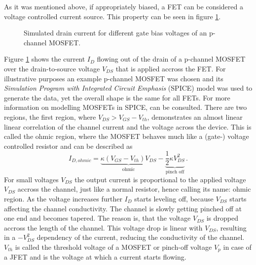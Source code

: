 As it was mentioned above, if appropriately biased, a FET can be considered a voltage controlled current source. This property can be seen in figure \ref{fig:fet_curret_gate_bias}.

\begin{figure}[hb]
    \centering
    
    \caption{Simulated drain current for different gate bias voltages of an  p-channel MOSFET.}
    \label{fig:fet_curret_gate_bias}
\end{figure}

Figure \ref{fig:fet_curret_gate_bias} shows the current $I_D$ flowing out of the drain of a p-channel MOSFET over the drain-to-source voltage $V_{DS}$ that is applied accross the FET. For illustrative purposes an example p-channel MOSFET was chosen and its \textit{Simulation Program with Integrated Circuit Emphasis} (SPICE) model \cite{irf9610_spice,irf9610_spice_better} was used to generate the data, yet the overall shape is the same for all FETs. For more information on modelling MOSFETs in SPICE, \citep[p. 442]{spice_mosfets} can be consulted. There are two regions, the first region, where $V_{DS} > V_{GS} - V_{th}$, demonstrates an almost linear linear correlation of the channel current and the voltage across the device. This is called the ohmic region, where the MOSFET behaves much like a (gate-) voltage controlled resistor and can be described \cite{shockley_fet_equations} as
\begin{equation}
    I_{D,ohmic} = \underbrace{\kappa (V_{GS} - V_{th}) V_{DS}}_{\text{ohmic}} - \underbrace{\frac 1 2 \kappa V_{DS}^2}_{\text{pinch off}} \, .
\end{equation}
For small voltages $V_{DS}$ the output current is proportional to the applied voltage $V_{DS}$ accross the channel, just like a normal resistor, hence calling its name: ohmic region. As the voltage increases further $I_D$ starts leveling off, because $V_{DS}$ starts affecting the channel conductivity. The channel is slowly getting pinched off at one end and becomes tapered. The reason is, that the voltage $V_{DS}$ is dropped accross the length of the channel. This voltage drop is linear with $V_{DS}$, resulting in a $-V_{DS}^2$ dependency of the current, reducing the conductivity of the channel. $V_{th}$ is called the threshold voltage of a MOSFET or pinch-off voltage $V_p$ in case of a JFET and is the voltage at which a current starts flowing.

